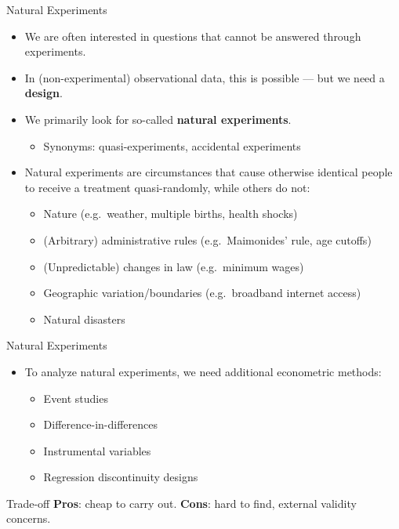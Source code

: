 \documentclass[11pt,aspectratio=169]{beamer}
\begin{document}
\begin{frame}{Natural Experiments}
  \begin{itemize}
    \item We are often interested in questions that cannot be answered through experiments.
    \item In (non-experimental) observational data, this is possible --- but we need a \textbf{design}.
    \item We primarily look for so-called \textbf{natural experiments}.
    \begin{itemize}
      \item Synonyms: quasi-experiments, accidental experiments
    \end{itemize}
    \item Natural experiments are circumstances that cause otherwise identical people to receive a treatment quasi-randomly, while others do not:
    \begin{itemize}
      \item Nature (e.g.\ weather, multiple births, health shocks)
      \item (Arbitrary) administrative rules (e.g.\ Maimonides' rule, age cutoffs)
      \item (Unpredictable) changes in law (e.g.\ minimum wages)
      \item Geographic variation/boundaries (e.g.\ broadband internet access)
      \item Natural disasters
    \end{itemize}
  \end{itemize}
\end{frame}

\begin{frame}{Natural Experiments}
  \begin{itemize}
    \item To analyze natural experiments, we need additional econometric methods:
    \begin{itemize}
      \item Event studies
      \item Difference-in-differences
      \item Instrumental variables
      \item Regression discontinuity designs
    \end{itemize}
  \end{itemize}
  \vspace{0.5em}
  \begin{alertblock}{Trade-off}
    \textbf{Pros}: cheap to carry out. \textbf{Cons}: hard to find, external validity concerns.
  \end{alertblock}
\end{frame}
\end{document}
